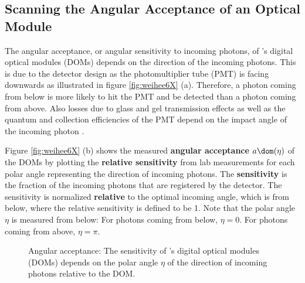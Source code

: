 
\subsection{Scanning the Angular Acceptance of an Optical Module}
\label{sec:angular_acceptance_scan}

The angular acceptance, or angular sensitivity to incoming photons, of \icecube's digital optical modules (DOMs) depends on the direction of the incoming photons.
This is due to the detector design as the photomultiplier tube (PMT) is facing downwards as illustrated in figure \ref{fig:weihee6X} (a). Therefore, a photon coming from below is more likely to hit the PMT and be detected than a photon coming from above. Also losses due to glass and gel transmission effects as well as the quantum and collection efficiencies of the PMT depend on the impact angle of the incoming photon \cite{icepaper}.


Figure \ref{fig:weihee6X} (b) shows the measured \textbf{angular acceptance} $a\dom(\eta)$ of the \icecube DOMs by plotting the \textbf{relative sensitivity} from lab measurements for each polar angle representing the direction of incoming photons. \cite{icepaper} The \textbf{sensitivity} is the fraction of the incoming photons that are registered by the detector. The sensitivity is normalized \textbf{relative} to the optimal incoming angle, which is from below, where the relative sensitivity is defined to be 1. Note that the polar angle $\eta$ is measured from below: For photons coming from below, $\eta = 0$. For photons coming from above, $\eta = \pi$.

\begin{figure}[htbp]
  \hfill
  \caption{Angular acceptance: The sensitivity of \icecube's digital optical modules (DOMs) depends on the polar angle $\eta$ of the direction of incoming photons relative to the DOM.}
  \label{fig:weihee6X}\label{fig:icepaper}
\end{figure}


